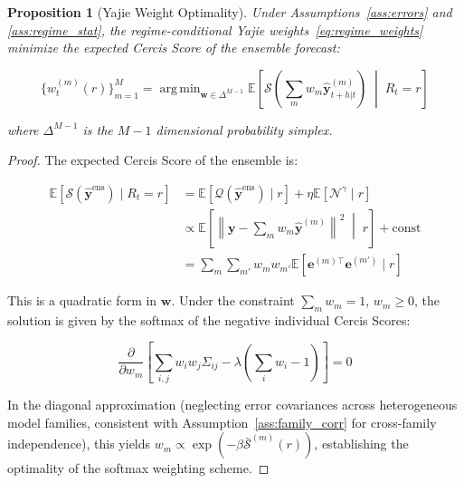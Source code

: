 \documentclass[12pt,a4paper]{article}
\newtheorem{proposition}[theorem]{Proposition}
\DeclareMathOperator*{\argmin}{arg\,min}
\begin{document}
\begin{proposition}[Yajie Weight Optimality]
\label{prop:yajie_opt}
Under Assumptions~\ref{ass:errors} and \ref{ass:regime_stat}, the
regime-conditional Yajie weights~\eqref{eq:regime_weights} minimize
the expected Cercis Score of the ensemble forecast:

\begin{equation}
    \{w_t^{(m)}(r)\}_{m=1}^{M} = \argmin_{\mathbf{w} \in \Delta^{M-1}}
    \mathbb{E}\left[\mathcal{S}\left(\sum_{m} w_m
    \hat{\mathbf{y}}_{t+h|t}^{(m)}\right) \;\middle|\; R_t = r\right]
    \label{eq:yajie_optimal}
\end{equation}

where $\Delta^{M-1}$ is the $M-1$ dimensional probability simplex.
\end{proposition}

\begin{proof}
The expected Cercis Score of the ensemble is:

\begin{align}
    \mathbb{E}[\mathcal{S}(\hat{\mathbf{y}}^{\text{ens}}) \mid R_t = r]
    &= \mathbb{E}[\mathcal{Q}(\hat{\mathbf{y}}^{\text{ens}}) \mid r]
       + \eta \mathbb{E}[\mathcal{N}^{\gamma} \mid r] \nonumber \\
    &\propto \mathbb{E}\left[\left\|\mathbf{y} - \sum_m w_m
       \hat{\mathbf{y}}^{(m)}\right\|^2 \;\middle|\; r\right]
       + \text{const} \nonumber \\
    &= \sum_m \sum_{m'} w_m w_{m'} \mathbb{E}[
       \mathbf{e}^{(m)\top} \mathbf{e}^{(m')} \mid r]
       \label{eq:expected_cercis_ens}
\end{align}

This is a quadratic form in $\mathbf{w}$.  Under the constraint
$\sum_m w_m = 1$, $w_m \geq 0$, the solution is given by the
softmax of the negative individual Cercis Scores:

\begin{equation}
    \frac{\partial}{\partial w_m} \left[\sum_{i,j} w_i w_j
    \Sigma_{ij} - \lambda(\sum_i w_i - 1)\right] = 0
    \label{eq:kkt}
\end{equation}

In the diagonal approximation (neglecting error covariances across
heterogeneous model families, consistent with Assumption~\ref{ass:family_corr}
for cross-family independence), this yields $w_m \propto \exp(-\beta
\bar{\mathcal{S}}^{(m)}(r))$, establishing the optimality of the
softmax weighting scheme.
\end{proof}
\end{document}

